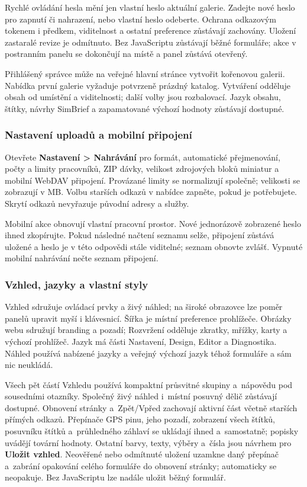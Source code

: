 \documentclass[11pt,a4paper]{article}
\newcommand{\ui}[1]{\textbf{#1}}
\begin{document}
Rychlé ovládání hesla mění jen vlastní heslo aktuální galerie. Zadejte nové
heslo pro zapnutí či nahrazení, nebo vlastní heslo odeberte. Ochrana odkazovým
tokenem i předkem, viditelnost a ostatní preference zůstávají zachovány. Uložení
zastaralé revize je odmítnuto. Bez JavaScriptu zůstávají běžné formuláře; akce v
postranním panelu se dokončují na místě a panel zůstává otevřený.

Přihlášený správce může na veřejné hlavní stránce vytvořit kořenovou galerii.
Nabídka první galerie vyžaduje potvrzeně prázdný katalog. Vytváření odděluje
obsah od umístění a viditelnosti; další volby jsou rozbalovací. Jazyk obsahu,
štítky, návrhy SimBrief a zapamatované výchozí hodnoty zůstávají dostupné.

\subsubsection{Nastavení uploadů a mobilní připojení}
Otevřete \ui{Nastavení > Nahrávání} pro formát, automatické přejmenování, počty
a limity pracovníků, ZIP dávky, velikost zdrojových bloků miniatur a mobilní
WebDAV připojení. Provázané limity se normalizují společně; velikosti se
zobrazují v MB. Volbu starších odkazů v nabídce zapněte, pokud je potřebujete.
Skrytí odkazů nevyřazuje původní adresy a služby.

Mobilní akce obnovují vlastní pracovní prostor. Nové jednorázově zobrazené heslo
ihned zkopírujte. Pokud následné načtení seznamu selže, připojení zůstává
uložené a heslo je v této odpovědi stále viditelné; seznam obnovte zvlášť.
Vypnuté mobilní nahrávání nečte seznam připojení.

\subsubsection{Vzhled, jazyky a vlastní styly}
Vzhled sdružuje ovládací prvky a živý náhled; na široké obrazovce lze poměr
panelů upravit myší i klávesnicí. Šířka je místní preference prohlížeče. Obrázky
webu sdružují branding a pozadí; Rozvržení odděluje zkratky, mřížky, karty a
výchozí prohlížeč. Jazyk má části Nastavení, Design, Editor a Diagnostika.
Náhled používá nabízené jazyky a veřejný výchozí jazyk téhož formuláře a sám nic
neukládá.

Všech pět částí Vzhledu používá kompaktní průsvitné skupiny a~nápovědu pod
sousedními otazníky. Společný živý náhled i~místní posuvný dělič zůstávají
dostupné.
Obnovení stránky a~Zpět/Vpřed zachovají aktivní část včetně starších přímých
odkazů.
Přepínače GPS pinu, jeho pozadí, zobrazení všech štítků, posuvníku štítků
a~průhledného záhlaví se ukládají ihned a~samostatně; popisky uvádějí tovární
hodnoty. Ostatní barvy, texty, výběry a~čísla jsou návrhem pro \ui{Uložit
vzhled}.
Neověřené nebo odmítnuté uložení uzamkne daný přepínač a~zabrání opakování
celého
formuláře do obnovení stránky; automaticky se neopakuje. Bez JavaScriptu lze
nadále uložit běžný formulář.
\end{document}
